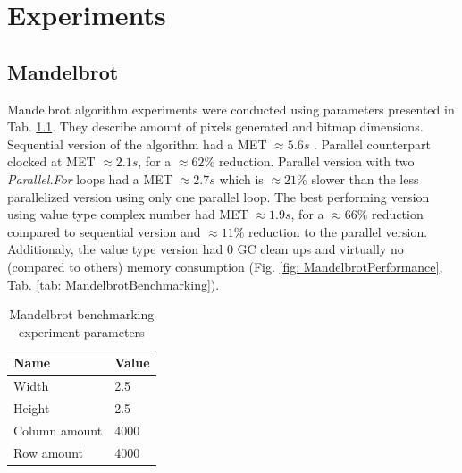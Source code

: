 \clearpage
\chapter{Experiments}

\clearpage
\section{Mandelbrot}
Mandelbrot algorithm experiments were conducted using parameters presented in Tab. \ref{tab: MandelbrotParameters}. They describe amount of pixels generated and bitmap dimensions.
Sequential version of the algorithm had a MET  $\approx 5.6s$ . Parallel counterpart clocked at MET  $\approx 2.1s$, for a $\approx 62\%$ reduction. Parallel version with two \emph{Parallel.For} loops had a MET $\approx 2.7s$ which is $\approx 21\%$ slower than the less parallelized version using only one parallel loop. The best performing version using value type complex number had MET $\approx 1.9s$, for a $\approx 66\%$  reduction compared to sequential version and $\approx 11\%$  reduction to the parallel version. Additionaly, the value type version had 0 GC clean ups and virtually no (compared to others) memory consumption (Fig. \ref{fig: MandelbrotPerformance}, Tab. \ref{tab: MandelbrotBenchmarking}).

\begin{table}[!ht]
    \centering
    \caption{Mandelbrot benchmarking experiment parameters}
		\label{tab: MandelbrotParameters}
    \begin{tabular}{p{3cm}p{3cm}}
			\toprule
			\bfseries Name 	&
			\bfseries Value \\
			\midrule
			Width & 2.5 \\
			Height & 2.5 \\
			Column amount & 4000 \\ 
			Row amount  & 4000 \\	
			\bottomrule
    \end{tabular}
\end{table}

